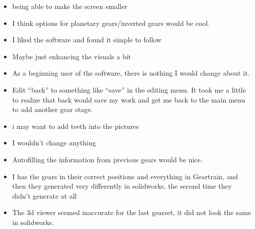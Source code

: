 \begin{itemize}
\item being able to make the screen smaller 
\item I think options for planetary gears/inverted gears would be cool. 
\item I liked the software and found it simple to follow
\item Maybe just enhancing the visuals a bit
\item As a beginning user of the software, there is nothing I would change about it.
\item Edit ``back'' to something like ``save'' in the editing menu. It took me a little to realize that back would save my work and get me back to the main menu to add another gear stage.
\item i may want to add teeth into the pictures
\item I wouldn't change anything
\item Autofilling the information from previous gears would be nice.
\item I has the gears in their correct positions and everything in Geartrain, and then they generated very differently in solidworks, the second time they didn't generate at all
\item The 3d viewer seemed inaccurate for the last gearset, it did not look the same in solidworks. 
\end{itemize}

